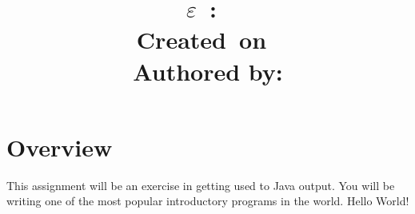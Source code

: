 \documentclass{report}
\title{
\vspace{2in}
\textmd{\textbf{\hmwkDesDiff$\varepsilon$\hmwkDesTime\ :\ \hmwkTitle}}\\
\normalsize\vspace{0.1in}\small{Created\ on\ \hmwkCreationDate}\\
\vspace{3in}
Authored by:
}
\author{\textbf{\hmwkAuthorName}}
\begin{document}
\maketitle



\newpage
\tableofcontents
\newpage


\section{Overview}
\hspace{2em}\large{This assignment will be an exercise in getting used to Java output. You will be writing one of the most popular introductory programs in the world. Hello World!}\\
\end{document}
